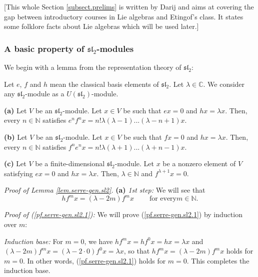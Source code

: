 \documentclass[etingof-lie.tex]{subfiles}
\begin{document}
[This whole Section \ref{subsect.prelims} is written by Darij and aims at
covering the gap between introductory courses in Lie algebras and Etingof's
class. It states some folklore facts about Lie algebras which will be used later.]

\subsubsection{A basic property of
\texorpdfstring{$\mathfrak{sl}_{2}$}{sl-2}-modules}

We begin with a lemma from the representation theory of $\mathfrak{sl}_{2}$:

\begin{lemma}
\label{lem.serre-gen.sl2}Let $e$, $f$ and $h$ mean the classical basis
elements of $\mathfrak{sl}_{2}$. Let $\lambda\in\mathbb{C}$. We consider any
$\mathfrak{sl}_{2}$-module as a $U\left(  \mathfrak{sl}_{2}\right)  $-module.

\textbf{(a)} Let $V$ be an $\mathfrak{sl}_{2}$-module. Let $x\in V$ be such
that $ex=0$ and $hx=\lambda x$. Then, every $n\in\mathbb{N}$ satisfies
$e^{n}f^{n}x=n!\lambda\left(  \lambda-1\right)  ...\left(  \lambda-n+1\right)
x$.

\textbf{(b)} Let $V$ be an $\mathfrak{sl}_{2}$-module. Let $x\in V$ be such
that $fx=0$ and $hx=\lambda x$. Then, every $n\in\mathbb{N}$ satisfies
$f^{n}e^{n}x=n!\lambda\left(  \lambda+1\right)  ...\left(  \lambda+n-1\right)
x$.

\textbf{(c)} Let $V$ be a finite-dimensional $\mathfrak{sl}_{2}$-module. Let
$x$ be a nonzero element of $V$ satisfying $ex=0$ and $hx=\lambda x$. Then,
$\lambda\in\mathbb{N}$ and $f^{\lambda+1}x=0$.
\end{lemma}

\textit{Proof of Lemma \ref{lem.serre-gen.sl2}.} \textbf{(a)} \textit{1st
step:} We will see that%
\begin{equation}
hf^{m}x=\left(  \lambda-2m\right)  f^{m}x\ \ \ \ \ \ \ \ \ \ \text{for every
}m\in\mathbb{N}. \label{pf.serre-gen.sl2.1}%
\end{equation}


\textit{Proof of (\ref{pf.serre-gen.sl2.1}):} We will prove
(\ref{pf.serre-gen.sl2.1}) by induction over $m$:

\textit{Induction base:} For $m=0$, we have $hf^{m}x=hf^{0}x=hx=\lambda x$ and
$\left(  \lambda-2m\right)  f^{m}x=\left(  \lambda-2\cdot0\right)
f^{0}x=\lambda x$, so that $hf^{m}x=\left(  \lambda-2m\right)  f^{m}x$ holds
for $m=0$. In other words, (\ref{pf.serre-gen.sl2.1}) holds for $m=0$. This
completes the induction base.
\end{document}
